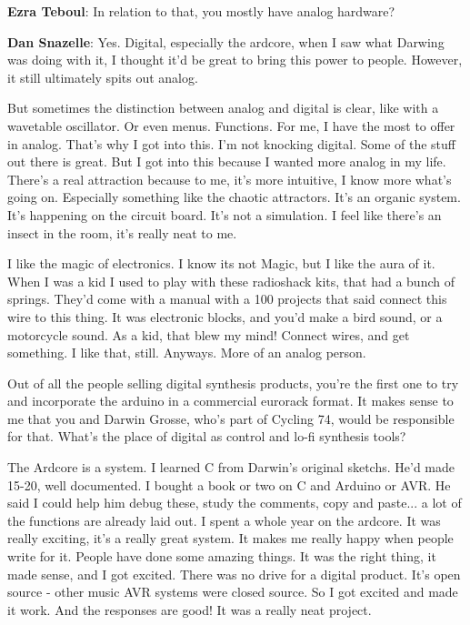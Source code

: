 \textbf{Ezra Teboul}: In relation to that, you mostly have analog hardware?

\textbf{Dan Snazelle}: Yes. Digital, especially the ardcore, when I saw what Darwing was doing with it, I thought it'd be great to bring this power to people. However, it still ultimately spits out analog. 

But sometimes the distinction between analog and digital is clear, like with a wavetable oscillator. Or even menus. Functions. For me, I have the most to offer in analog. That's why I got into this. I'm not knocking digital. Some of the stuff out there is great. But I got into this because I wanted more analog in my life. There's a real attraction because to me, it's more intuitive, I know more what's going on. Especially something like the chaotic attractors. It's an organic system. It's happening on the circuit board. It's not a simulation. I feel like there's an insect in the room, it's really neat to me. 

I like the magic of electronics. I know its not Magic, but I like the aura of it. When I was a kid I used to play with these radioshack kits, that had a bunch of springs. They'd come with a manual with a 100 projects that said connect this wire to this thing. It was electronic blocks, and you'd make a bird sound, or a motorcycle sound. As a kid, that blew my mind! Connect wires, and get something. I like that, still. Anyways. More of an analog person. 

Out of all the people selling digital synthesis products, you're the first one to try and incorporate the arduino in a commercial eurorack format. It makes sense to me that you and Darwin Grosse, who's part of Cycling 74, would be responsible for that. What's the place of digital as control and lo-fi synthesis tools? 

The Ardcore is a system. I learned C from Darwin's original sketchs. He'd made 15-20, well documented. I bought a book or two on C and Arduino or AVR. He said I could help him debug these, study the comments, copy and paste... a lot of the functions are already laid out. I spent a whole year on the ardcore. It was really exciting, it's a really great system. It makes me really happy when people write for it. People have done some amazing things. It was the right thing, it made sense, and I got excited. There was no drive for a digital product. It's open source - other music AVR systems were closed source. So I got excited and made it work. And the responses are good! It was a really neat project. 

